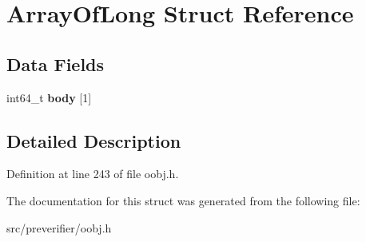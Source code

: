 \section{ArrayOfLong Struct Reference}
\label{struct_array_of_long}
\subsection*{Data Fields}
\begin{DoxyCompactItemize}
\item 
int64\_\-t {\bfseries body} [1]\label{struct_array_of_long_abbd373a5489a2e5d016a91044b2472fa}

\end{DoxyCompactItemize}


\subsection{Detailed Description}


Definition at line 243 of file oobj.h.



The documentation for this struct was generated from the following file:\begin{DoxyCompactItemize}
\item 
src/preverifier/oobj.h\end{DoxyCompactItemize}
